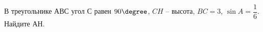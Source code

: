 \begin{ex}
	\begin{condition}
		В треугольнике \( АВС \) угол \( С \) равен \( 90 \degree \), \( CH \) – высота, \( BC=3 \),  \( \sin A=\dfrac{1}{6} \). Найдите \( АН \).
	\end{condition}
\end{ex}